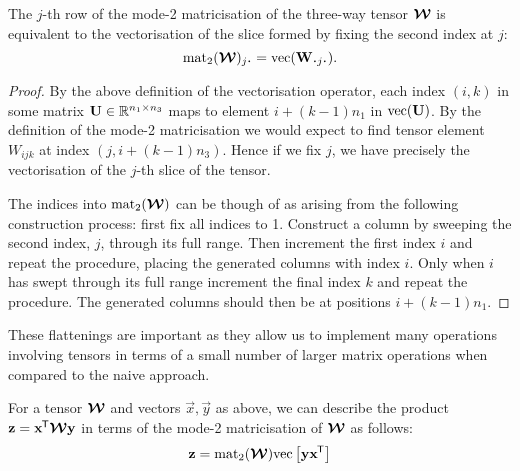 \begin{lem}
The \(j\)-th row of the mode-2 matricisation of the three-way tensor \(\bm{\mathcal{W}}\)
is equivalent to the vectorisation of the slice formed by fixing the second index at \(j\):
\begin{equation}\label{eq:matlemstatement}
	\matr_2 (\tensor{W})_{j \midbullet} = \vect(\mat{W}_{\midbullet j \midbullet}).
\end{equation}
\label{lem:matricise}
\end{lem}
\begin{proof}
By the above definition of the vectorisation operator, each index \((i, k)\) in some matrix
\(\mathbf{U} \in \mathbb{R}^{n_1\times n_3}\) maps to element \(i + (k-1)n_1\) in
\(\operatorname{vec}(\mathbf{U})\). By the definition of the mode-2 matricisation we would expect to
find tensor element \(W_{ijk}\) at index \((j, i + (k-1)n_3)\). Hence if we fix \(j\), we have
precisely the vectorisation of the \(j\)-th slice of the tensor.

The indices into \(\operatorname{mat}_2(\bm{\mathcal{W}})\) can be though of as arising from the following construction
process: first fix all indices to 1. Construct a column by sweeping the second index, \(j\),
through its full range. Then increment the first index \(i\) and repeat the procedure, placing
the generated columns with index \(i\). Only when \(i\) has swept through its full range
increment the final index \(k\) and repeat the procedure. The generated columns should then be
at positions \(i + (k-1)n_1\).
\end{proof}

These flattenings are important as they allow us to
implement many operations involving tensors in terms of a small number of larger matrix
operations when compared to the naive approach.

\begin{lem}\label{lem:outerprod}
For a tensor \(\bm{\mathcal{W}}\) and vectors \(\vec{x}, \vec{y}\) as above,
we can describe the product \(\mathbf{z} = \mathbf{x}^{\mkern-1.5mu\mathsf{T}}\bm{\mathcal{W}}\mathbf{y}\) in terms of the
mode-2 matricisation of \(\bm{\mathcal{W}}\) as 
follows:
\begin{align}
	\mathbf{z} = \operatorname{mat}_2(\bm{\mathcal{W}})\mathrm{vec}\left[\mathbf{y}\mathbf{x}^{\mkern-1.5mu\mathsf{T}}\right]
	\label{eq:bilinearouter}
\end{align}
\end{lem}

